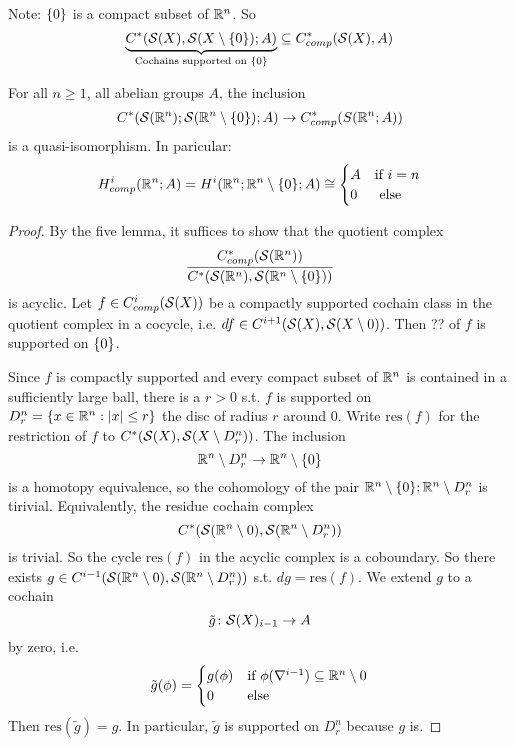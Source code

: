 \documentclass[language=english]{TemplateLecture}
\begin{document}
\begin{example}
    Note: \(\{0\}\) is a compact subset of \(\mathbb{R}^n\). So
    \[\underbrace{C^*(\mathcal{S}(X), \mathcal{S}(X\setminus \{0\}); A)}_{\text{Cochains supported on } \{0\}} \subseteq C^*_{comp}(\mathcal{S}(X),A)\]

    \begin{proposition}
        For all \(n \geq 1\), all abelian groups \(A\), the inclusion
        \[C^*(\mathcal{S}(\mathbb{R}^n); \mathcal{S}(\mathbb{R}^n\setminus \{0\});A) \to C_{comp}^*(S(\mathbb{R}^n;A))\]
        is a quasi-isomorphism. In paricular:
        \[H_{comp}^{i}(\mathbb{R}^n; A) = H^{i}(\mathbb{R}^n; \mathbb{R}^n\setminus \{0\}; A) \cong \begin{cases}
            A & \text{if } i = n \\
            0 & \text{ else} \\
        \end{cases}\]
    \end{proposition}

    \begin{proof}
        By the five lemma, it suffices to show that the quotient complex
        \[\frac{C_{comp}^*(\mathcal{S}(\mathbb{R}^n))}{C^*(\mathcal{S}(\mathbb{R}^n), \mathcal{S}(\mathbb{R}^n\setminus \{0\}))}\]
        is acyclic. Let \(f \in C^{i}_{comp}(\mathcal{S}(X))\) be a compactly supported cochain  class in the quotient complex in a cocycle, i.e. \(df \in C^{i+1}(\mathcal{S}(X), \mathcal{S}(X \setminus 0))\). Then ?? of \(f\) is supported on \(\{0\}\).

        Since \(f\) is compactly supported and every compact subset of \(\mathbb{R}^n\) is contained in a sufficiently large ball, there is a \(r > 0\) s.t. \(f\) is supported on \(D_r^n = \{x \in \mathbb{R}^n : \lvert x\rvert \leq r\}\) the disc of radius \(r\) around \(0\). Write \(\mathrm{res}(f)\) for the restriction of \(f\) to \(C^*(\mathcal{S}(X), \mathcal{S}(X \setminus D_r^n))\). The inclusion
        \[\mathbb{R}^n \setminus D_r^n \to \mathbb{R}^n \setminus \{0\}\]
        is a homotopy equivalence, so the cohomology of the pair \(\mathbb{R}^n\setminus \{0\}; \mathbb{R}^n \setminus D_r^n\) is tirivial. Equivalently, the residue cochain complex
        \[C^*(\mathcal{S}(\mathbb{R}^n \setminus 0), \mathcal{S}(\mathbb{R}^n \setminus D_r^n))\]
        is trivial. So the cycle \(\mathrm{res}(f)\) in the acyclic complex is a coboundary. So there exists \(g \in C^{i-1}(\mathcal{S}(\mathbb{R}^n \setminus 0), \mathcal{S}(\mathbb{R}^n \setminus D_r^n))\) s.t. \(dg = \mathrm{res}(f)\). We extend \(g\) to a cochain
        \[\tilde g \colon \mathcal{S}(X)_{i-1} \to A\] by zero, i.e. 
        \[\tilde g(\phi) = \begin{cases}
            g(\phi) & \text{if } \phi(\nabla^{i-1}) \subseteq \mathbb{R}^n \setminus 0 \\
            0 & \text{else} \\ 
        \end{cases}\]
        Then \(\mathrm{res}(\tilde g) = g\). In particular, \(\tilde g\) is supported on \(D_r^n\) because \(g\) is.


\end{proof}
\end{example}
\end{document}
